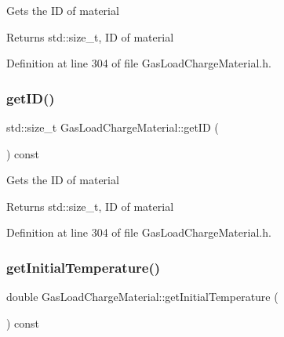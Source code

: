 Gets the ID of material

\begin{DoxyReturn}{Returns}
std\+::size\+\_\+t, ID of material 
\end{DoxyReturn}


Definition at line 304 of file Gas\+Load\+Charge\+Material.\+h.

\mbox{\label{class_gas_load_charge_material_a32dc0d73857ebe4322cf525064713cf6}} 
\subsubsection{\texorpdfstring{get\+I\+D()}{getID()}\hspace{0.1cm}{\footnotesize\ttfamily [3/3]}}
{\footnotesize\ttfamily std\+::size\+\_\+t Gas\+Load\+Charge\+Material\+::get\+ID (\begin{DoxyParamCaption}{ }\end{DoxyParamCaption}) const\hspace{0.3cm}{\ttfamily [inline]}}

Gets the ID of material

\begin{DoxyReturn}{Returns}
std\+::size\+\_\+t, ID of material 
\end{DoxyReturn}


Definition at line 304 of file Gas\+Load\+Charge\+Material.\+h.

\mbox{\label{class_gas_load_charge_material_af8a83c3720d108baa196394105822db7}} 
\subsubsection{\texorpdfstring{get\+Initial\+Temperature()}{getInitialTemperature()}\hspace{0.1cm}{\footnotesize\ttfamily [1/3]}}
{\footnotesize\ttfamily double Gas\+Load\+Charge\+Material\+::get\+Initial\+Temperature (\begin{DoxyParamCaption}{ }\end{DoxyParamCaption}) const\hspace{0.3cm}{\ttfamily [inline]}}

